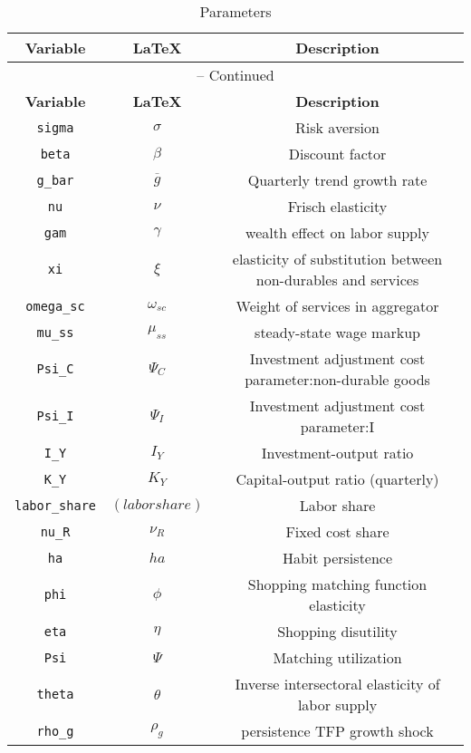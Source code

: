 \begin{center}
\begin{longtable}{ccc}
\caption{Parameters}\\%
\hline%
\multicolumn{1}{c}{\textbf{Variable}} &
\multicolumn{1}{c}{\textbf{\LaTeX}} &
\multicolumn{1}{c}{\textbf{Description}}\\%
\hline\hline%
\endfirsthead
\multicolumn{3}{c}{{\tablename} \thetable{} -- Continued}\\%
\hline%
\multicolumn{1}{c}{\textbf{Variable}} &
\multicolumn{1}{c}{\textbf{\LaTeX}} &
\multicolumn{1}{c}{\textbf{Description}}\\%
\hline\hline%
\endhead
\texttt{sigma} & ${\sigma}$ & Risk aversion\\
\texttt{beta} & ${\beta}$ & Discount factor\\
\texttt{g\_bar} & ${\overline{g}}$ & Quarterly trend growth rate\\
\texttt{nu} & $\nu$ & Frisch elasticity\\
\texttt{gam} & $\gamma$ & wealth effect on labor supply\\
\texttt{xi} & $\xi$ & elasticity of substitution between non-durables and services\\
\texttt{omega\_sc} & $\omega_{sc}$ & Weight of services in aggregator\\
\texttt{mu\_ss} & $\mu_{ss}$ & steady-state wage markup\\
\texttt{Psi\_C} & ${\Psi_{C}}$ & Investment adjustment cost parameter:non-durable goods\\
\texttt{Psi\_I} & ${\Psi_I}$ & Investment adjustment cost parameter:I\\
\texttt{I\_Y} & ${I_Y}$ & Investment-output ratio\\
\texttt{K\_Y} & ${K_Y}$ & Capital-output ratio (quarterly)\\
\texttt{labor\_share} & $(labor share)$ & Labor share\\
\texttt{nu\_R} & ${\nu_R}$ & Fixed cost share\\
\texttt{ha} & ${ha}$ & Habit persistence\\
\texttt{phi} & ${\phi}$ & Shopping matching function elasticity\\
\texttt{eta} & ${\eta}$ & Shopping disutility\\
\texttt{Psi} & ${\Psi}$ & Matching utilization\\
\texttt{theta} & ${\theta}$ & Inverse intersectoral elasticity of labor supply\\
\texttt{rho\_g} & ${\rho_g}$ & persistence TFP growth shock\\

\end{longtable}
\end{center}
